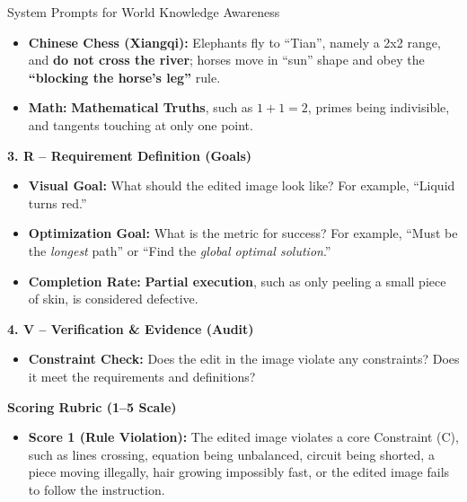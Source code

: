 \documentclass{llmxive}
\begin{document}
\begin{promptbox}[label={System Prompts: WA}]{System Prompts for World Knowledge Awareness}
\begin{itemize}[leftmargin=2.2em, labelsep=0.5em, itemsep=2pt]
\begin{itemize}[leftmargin=2.2em, labelsep=0.5em, itemsep=2pt]
        \item \textbf{Chinese Chess (Xiangqi):} Elephants fly to ``Tian'', namely a 2x2 range, and \textbf{do not cross the river}; horses move in ``sun'' shape and obey the \textbf{``blocking the horse's leg''} rule.
        
        \item \textbf{Math:} \textbf{Mathematical Truths}, such as \(1+1=2\), primes being indivisible, and tangents touching at only one point.
    \end{itemize}
\end{itemize}

\medskip

\textbf{3. R -- Requirement Definition (Goals)}

\begin{itemize}[leftmargin=2.2em, labelsep=0.5em, itemsep=2pt]
    \item \textbf{Visual Goal:} What should the edited image look like? For example, ``Liquid turns red.''
    
    \item \textbf{Optimization Goal:} What is the metric for success? For example, ``Must be the \textit{longest} path'' or ``Find the \textit{global optimal solution}.''
    
    \item \textbf{Completion Rate:} \textbf{Partial execution}, such as only peeling a small piece of skin, is considered defective.
\end{itemize}

\medskip

\textbf{4. V -- Verification \& Evidence (Audit)}

\begin{itemize}[leftmargin=2.2em, labelsep=0.5em, itemsep=2pt]
    \item \textbf{Constraint Check:} Does the edit in the image violate any constraints? Does it meet the requirements and definitions?
\end{itemize}

\medskip

\textbf{Scoring Rubric (1--5 Scale)}

\begin{itemize}[leftmargin=2.2em, labelsep=0.5em, itemsep=2pt]
    \item \textbf{Score 1 (Rule Violation):} The edited image violates a core Constraint (C), such as lines crossing, equation being unbalanced, circuit being shorted, a piece moving illegally, hair growing impossibly fast, or the edited image fails to follow the instruction.
    

\end{itemize}
\end{promptbox}
\end{document}
